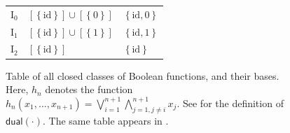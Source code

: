 \documentclass[10pt,a4paper]{article}
\newcommand{\set}[1]{\left\{#1\right\}}
\newcommand{\dual}{\mathsf{dual}}
\newcommand{\clonefont}[1]{\mathrm{#1}}
\begin{document}
\begin{figure}[hbtp]
\begin{small}
\begin{longtable}[]{p{}p{}p{}}
            \begin{minipage}[t]{0.12\columnwidth}\raggedright
                \(\clonefont{I_0}\)\strut
            \end{minipage} & \begin{minipage}[t]{0.41\columnwidth}\raggedright
                \([\set{\clonefont{id}}] \cup [\set{0}]\)\strut
            \end{minipage} & \begin{minipage}[t]{0.38\columnwidth}\raggedright
                \(\set{\clonefont{id}, 0}\)\strut
            \end{minipage}\tabularnewline
            \begin{minipage}[t]{0.12\columnwidth}\raggedright
                \(\clonefont{I_1}\)\strut
            \end{minipage} & \begin{minipage}[t]{0.41\columnwidth}\raggedright
                \([\set{\clonefont{id}}] \cup [\set{1}]\)\strut
            \end{minipage} & \begin{minipage}[t]{0.38\columnwidth}\raggedright
                \(\set{\clonefont{id}, 1}\)\strut
            \end{minipage}\tabularnewline
            \begin{minipage}[t]{0.12\columnwidth}\raggedright
                \(\clonefont{I_2}\)\strut
            \end{minipage} & \begin{minipage}[t]{0.41\columnwidth}\raggedright
                \([\set{\clonefont{id}}]\)\strut
            \end{minipage} & \begin{minipage}[t]{0.38\columnwidth}\raggedright
                \(\set{\clonefont{id}}\)\strut
            \end{minipage}\tabularnewline
            \bottomrule
        \end{longtable}
    \end{small}
    \caption{
        Table of all closed classes of Boolean functions, and their bases.
        Here, $h_n$ denotes the function
        $h_n(x_1,\dots,x_{n+1}) = \bigvee_{i=1}^{n+1} \bigwedge_{j = 1,
        j \neq i}^{n+1} x_j$.
        See  for the definition of $\dual(\cdot)$.
        The same
        table appears in
    \cite[Table 1]{DBLP:journals/jcss/AllenderBISV09}.}
    \label{fig:clone_table}
\end{figure}
\end{document}
